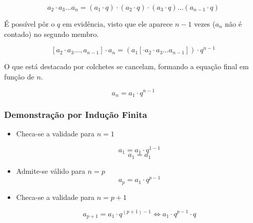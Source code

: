 \documentclass[11pt]{article}
\begin{document}
\[a_{2} \cdot a_{3}\dots a_{n} = (a_1\cdot q) \cdot (a_2\cdot q) \cdot (a_3\cdot q) \dots (a_{n - 1} \cdot q)\]

É possível pôr o $q$ em evidência, visto que ele aparece $n - 1$ vezes ($a_{n}$ não é contado) no segundo membro.

\[[a_{2} \cdot a_{3}\dots, a_{n - 1}]\cdot a_{n} = (a_1 [\cdot a_2 \cdot a_3 \dots a_{n - 1}])\cdot q^{n - 1}\]

O que está destacado por colchetes se cancelam, formando a equação final em função de $n$.


\begin{tcolorbox}[colback=LightYellow]
  \[a_{n} = a_1\cdot q^{n - 1}\]
\end{tcolorbox}

\subsubsection{Demonstração por Indução Finita}

\begin{itemize}
  \item Checa-se a validade para $n = 1$

  \[a_{1} = a_{1}\cdot q^{1-1}\]
  \[a_{1} = a_{1}\]

  \item Admite-se válido para $n = p$
        \[a_{p} = a_{1}\cdot q^{p - 1}\]

  \item Checa-se a validade para $n = p + 1$

        \[a_{p + 1} = a_{1}\cdot q^{(p + 1) - 1} \Leftrightarrow a_{1}\cdot q^{p-1}\cdot q\]
\end{itemize}
\end{document}
